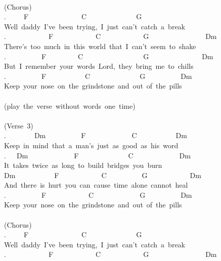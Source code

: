 {\\
(Chorus)\\
.\ \ \ \ \ F\ \ \ \ \ \ \ \ \ \ \ \ \ \ \ C\ \ \ \ \ \ \ \ \ \ \ \ \ \ G\\
Well\ daddy\ I've\ been\ trying,\ I\ just\ can't\ catch\ a\ break\\
.\ \ \ \ \ \ \ \ \ \ \ \ F\ \ \ \ \ \ \ \ \ \ \ \ C\ \ \ \ \ \ \ \ \ \ \ \ G\ \ \ \ \ \ \ \ \ \ \ \ \ \ \ \ Dm\\
There's\ too\ much\ in\ this\ world\ that\ I\ can't\ seem\ to\ shake\\
.\ \ \ \ \ \ \ \ \ \ F\ \ \ \ \ \ \ \ \ C\ \ \ \ \ \ \ \ \ \ \ \ \ \ \ \ \ G\ \ \ \ \ \ \ \ \ \ \ \ \ \ \ Dm\\
But\ I\ remember\ your\ words\ Lord,\ they\ bring\ me\ to\ chills\\
.\ \ \ \ \ \ \ \ \ \ F\ \ \ \ \ \ \ \ \ \ \ C\ \ \ \ \ \ \ \ \ \ \ \ \ \ G\ \ \ \ \ \ \ \ \ \ Dm\\
Keep\ your\ nose\ on\ the\ grindstone\ and\ out\ of\ the\ pills\\
\\
(play\ the\ verse\ without\ words\ one\ time)\\
\\
(Verse\ 3)\\
.\ \ \ \ \ \ \ \ Dm\ \ \ \ \ \ \ \ \ \ F\ \ \ \ \ \ \ \ \ \ \ \ \ C\ \ \ \ \ \ \ \ \ \ \ Dm\\
Keep\ in\ mind\ that\ a\ man's\ just\ as\ good\ as\ his\ word\\
.\ \ \ Dm\ \ \ \ \ \ \ \ \ \ \ \ \ F\ \ \ \ \ \ \ \ \ \ \ \ \ \ C\ \ \ \ \ \ \ \ \ \ \ \ \ Dm\\
It\ takes\ twice\ as\ long\ to\ build\ bridges\ you\ burn\\
Dm\ \ \ \ \ \ \ \ \ \ \ F\ \ \ \ \ \ \ \ \ \ \ \ C\ \ \ \ \ \ \ \ \ \ G\ \ \ \ \ \ \ \ \ \ \ \ Dm\\
And\ there\ is\ hurt\ you\ can\ cause\ time\ alone\ cannot\ heal\\
.\ \ \ \ \ \ \ \ \ \ F\ \ \ \ \ \ \ \ \ \ \ \ C\ \ \ \ \ \ \ \ \ \ \ \ \ G\ \ \ \ \ \ \ \ \ \ Dm\\
Keep\ your\ nose\ on\ the\ grindstone\ and\ out\ of\ the\ pills\\
\\
(Chorus)\\
.\ \ \ \ \ F\ \ \ \ \ \ \ \ \ \ \ \ \ \ \ C\ \ \ \ \ \ \ \ \ \ \ \ \ \ G\\
Well\ daddy\ I've\ been\ trying,\ I\ just\ can't\ catch\ a\ break\\
.\ \ \ \ \ \ \ \ \ \ \ \ F\ \ \ \ \ \ \ \ \ \ \ \ C\ \ \ \ \ \ \ \ \ \ \ \ G\ \ \ \ \ \ \ \ \ \ \ \ \ \ \ \ Dm\\
}
